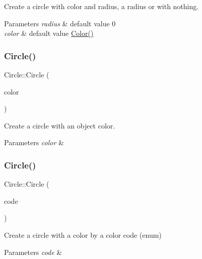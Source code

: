 Create a circle with color and radius, a radius or with nothing. 


\begin{DoxyParams}{Parameters}
{\em radius} & default value 0 \\
\hline
{\em color} & default value \hyperlink{classColor}{Color()} \\
\hline
\end{DoxyParams}
\mbox{\label{classCircle_a5717f409ec880455c624c66e6d72986d}} 
\subsubsection{\texorpdfstring{Circle()}{Circle()}\hspace{0.1cm}{\footnotesize\ttfamily [2/3]}}
{\footnotesize\ttfamily Circle\+::\+Circle (\begin{DoxyParamCaption}\item[{const \hyperlink{classColor}{Color} \&}]{color }\end{DoxyParamCaption})}



Create a circle with an object color. 


\begin{DoxyParams}{Parameters}
{\em color} & \\
\hline
\end{DoxyParams}
\mbox{\label{classCircle_a3a467448cf897cd57b6037c8e94578c7}} 
\subsubsection{\texorpdfstring{Circle()}{Circle()}\hspace{0.1cm}{\footnotesize\ttfamily [3/3]}}
{\footnotesize\ttfamily Circle\+::\+Circle (\begin{DoxyParamCaption}\item[{\hyperlink{classColor_a20a7b04657c1d83fae5d54514d3f1622}{Color\+::\+Code}}]{code }\end{DoxyParamCaption})}



Create a circle with a color by a color code (enum) 


\begin{DoxyParams}{Parameters}
{\em code} & \\
\hline
\end{DoxyParams}


